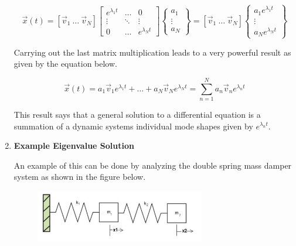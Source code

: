\begin{enumerate}
    \begin{equation}
      \vec{x}(t) = [\vec{v}_1~\hdots~\vec{v}_N] \begin{bmatrix} e^{\lambda_1 t} & \hdots & 0 \\ \vdots & \ddots
        & \vdots \\ 0 & \hdots & e^{\lambda_N
          t} \end{bmatrix} \begin{Bmatrix} a_1 \\ \vdots
        \\ a_N \end{Bmatrix} =  [\vec{v}_1~\hdots~\vec{v}_N] \begin{Bmatrix} a_1
            e^{\lambda_1 t} \\ \vdots \\ a_N e^{\lambda_N t} \end{Bmatrix}
    \end{equation}

    Carrying out the last matrix multiplication leads to a very
    powerful result as given by the equation below.

   \begin{equation}
     \vec{x}(t) = a_1\vec{v}_1e^{\lambda_1 t} + \hdots +
     a_N\vec{v}_Ne^{\lambda_N t} = \sum\limits_{n=1}^N a_n\vec{v}_n
     e^{\lambda_n t}
   \end{equation}

   This result says that a general solution to a differential equation
   is a summation of a dynamic systems individual mode shapes given by
   $e^{\lambda_n t}$. 

 \item {\bf Example Eigenvalue Solution}

   An example of this can be done by analyzing the double spring mass
   damper system as shown in the figure below.

   \begin{figure}[htb]
     \begin{center}
       \includegraphics[height=0.2\textwidth,width=0.7\textwidth]{Graphics/mass_spring_system2.png}
     \end{center}
   \end{figure}
   

\end{enumerate}

